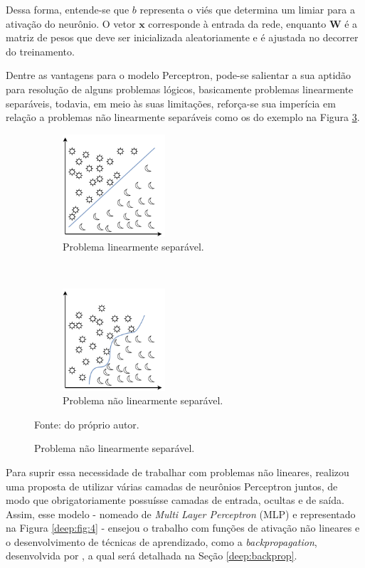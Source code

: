 Dessa forma, entende-se que $b$ representa o viés que determina um limiar para a ativação do neurônio. O vetor $\textbf{x}$ corresponde à entrada da rede, enquanto $\textbf{W}$ é a matriz de pesos que deve ser inicializada aleatoriamente e é ajustada no decorrer do treinamento.

Dentre as vantagens para o modelo Perceptron, pode-se salientar a sua aptidão para resolução de alguns problemas lógicos, basicamente problemas linearmente separáveis, todavia, em meio às suas limitações, reforça-se sua imperícia em relação a problemas não linearmente separáveis como os do exemplo na Figura \ref{deep:fig:3.2}.

\begin{figure}[H]
   \caption{Representação de problemas linearmente e não linearmente separáveis.}
   \centering
   \label{deep:fig:3}
    \begin{subfigure}[t]{0.45\textwidth}
        \centering
        \includegraphics[height=1.5in]{recursos/imagens/deep/l_separavel.png}
        \caption{Problema linearmente separável.}
        \label{deep:fig:3.1}
    \end{subfigure}%
    ~ 
    \begin{subfigure}[t]{0.45\textwidth}
        \centering
        \includegraphics[height=1.5in]{recursos/imagens/deep/nl_separavel.png}
        \caption{Problema não linearmente separável.}
        \label{deep:fig:3.2}
    \end{subfigure}%

    Fonte: do próprio autor.
\end{figure}

Para suprir essa necessidade de trabalhar com problemas não lineares, \cite{Werbos:74} realizou uma proposta de utilizar várias camadas de neurônios Perceptron juntos, de modo que obrigatoriamente possuísse camadas de entrada, ocultas e de saída. Assim, esse modelo - nomeado de \textit{Multi Layer Perceptron} (MLP) \citep{Werbos:74} e representado na Figura \ref{deep:fig:4} - ensejou o trabalho com funções de ativação não lineares e o desenvolvimento de técnicas de aprendizado, como a \textit{backpropagation}, desenvolvida por \cite{rumelhart1986learning}, a qual será detalhada na Seção \ref{deep:backprop}.

